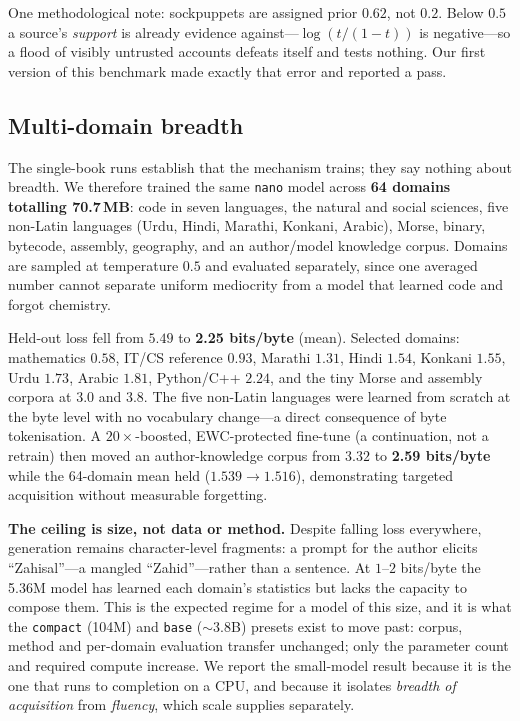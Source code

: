 \documentclass[10pt,twocolumn]{article}
\begin{document}
One methodological note: sockpuppets are assigned prior $0.62$, not $0.2$. Below
$0.5$ a source's \emph{support} is already evidence against---$\log(t/(1-t))$
is negative---so a flood of visibly untrusted accounts defeats itself and tests
nothing. Our first version of this benchmark made exactly that error and
reported a pass.

\subsection{Multi-domain breadth}
\label{sec:breadth}

The single-book runs establish that the mechanism trains; they say nothing about
breadth. We therefore trained the same \texttt{nano} model across \textbf{64
domains totalling 70.7\,MB}: code in seven languages, the natural and social
sciences, five non-Latin languages (Urdu, Hindi, Marathi, Konkani, Arabic),
Morse, binary, bytecode, assembly, geography, and an author/model knowledge
corpus. Domains are sampled at temperature $0.5$ and evaluated separately, since
one averaged number cannot separate uniform mediocrity from a model that learned
code and forgot chemistry.

Held-out loss fell from $5.49$ to \textbf{2.25 bits/byte} (mean). Selected
domains: mathematics $0.58$, IT/CS reference $0.93$, Marathi $1.31$, Hindi
$1.54$, Konkani $1.55$, Urdu $1.73$, Arabic $1.81$, Python/C++ $2.24$, and the
tiny Morse and assembly corpora at $3.0$ and $3.8$. The five non-Latin languages
were learned from scratch at the byte level with no vocabulary change---a direct
consequence of byte tokenisation. A $20\times$-boosted, EWC-protected fine-tune
(a continuation, not a retrain) then moved an author-knowledge corpus from $3.32$
to \textbf{2.59 bits/byte} while the 64-domain mean held ($1.539 \rightarrow
1.516$), demonstrating targeted acquisition without measurable forgetting.

\textbf{The ceiling is size, not data or method.} Despite falling loss
everywhere, generation remains character-level fragments: a prompt for the author
elicits ``Zahisal''---a mangled ``Zahid''---rather than a sentence. At
$1$--$2$ bits/byte the 5.36M model has learned each domain's statistics but lacks
the capacity to compose them. This is the expected regime for a model of this
size, and it is what the \texttt{compact} (104M) and \texttt{base} ($\sim$3.8B)
presets exist to move past: corpus, method and per-domain evaluation transfer
unchanged; only the parameter count and required compute increase. We report the
small-model result because it is the one that runs to completion on a CPU, and
because it isolates \emph{breadth of acquisition} from \emph{fluency}, which
scale supplies separately.
\end{document}
